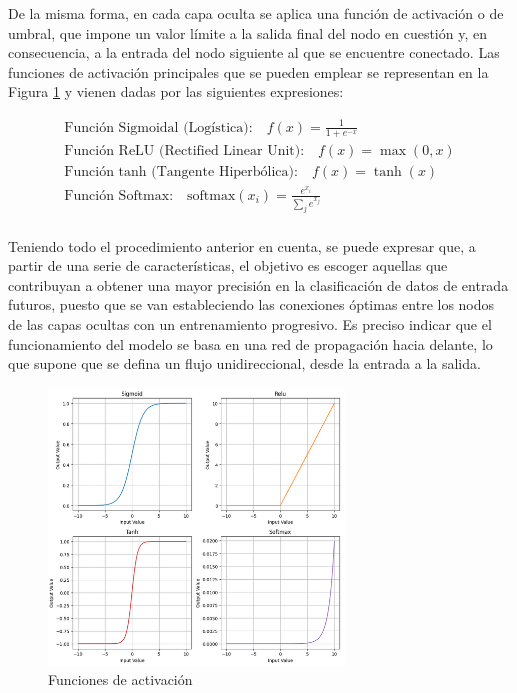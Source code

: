 \vspace{3mm}

De la misma forma, en cada capa oculta se aplica una función de activación o de umbral, que impone un valor límite a la salida final del nodo en cuestión y, en consecuencia, a la entrada del nodo siguiente al que se encuentre conectado. Las funciones de activación principales que se pueden emplear se representan en la Figura \ref{fig:functions} y vienen dadas por las siguientes expresiones: \cite{factiv} \cite{functions}

\begin{equation}
    \begin{aligned}
        \text{Función Sigmoidal (Logística):} \quad f(x) = \frac{1}{1 + e^{-x}} \\
        \text{Función ReLU (Rectified Linear Unit):} \quad f(x) = \max(0, x) \\
        \text{Función tanh (Tangente Hiperbólica):} \quad f(x) = \tanh(x) \\
        \text{Función Softmax:} \quad \text{softmax}(x_i) = \frac{e^{x_i}}{\sum_{j} e^{x_j}} \\
    \end{aligned}
\end{equation}

Teniendo todo el procedimiento anterior en cuenta, se puede expresar que, a partir de una serie de características, el objetivo es escoger aquellas que contribuyan a obtener una mayor precisión en la clasificación de datos de entrada futuros, puesto que se van estableciendo las conexiones óptimas entre los nodos de las capas ocultas con un entrenamiento progresivo. Es preciso indicar que el funcionamiento del modelo se basa en una red de propagación hacia delante, lo que supone que se defina un flujo unidireccional, desde la entrada a la salida. 

\vspace{3mm}

\begin{figure}[h!]
    \centering
    \includegraphics[width=0.7\textwidth]{img/teoria/functions.png}
    \caption{Funciones de activación \cite{functions}}
    \label{fig:functions}
\end{figure}

